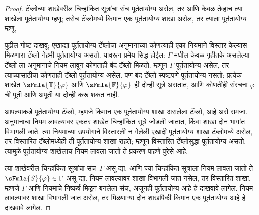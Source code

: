 \documentclass[11pt,a4paper,openany]{book}
\theoremstyle{definition}
\newcommand{\True}{\ensuremath{\mathbb{T}}}
\newcommand{\False}{\ensuremath{\mathbb{F}}}
\begin{document}
\begin{proof}
टॅब्लोच्या शाखेवरील चिन्हांकित सूत्रांचा संच पूर्ततायोग्य असेल, तर
आणि केवळ तेव्हाच त्या शाखेला पूर्ततायोग्य म्हणू; तसेच टॅब्लोमध्ये
किमान एक पूर्ततायोग्य शाखा असेल, तर त्याला पूर्ततायोग्य म्हणू.

पुढील गोष्ट दाखवू: एखाद्या पूर्ततायोग्य टॅब्लोचा अनुमानाच्या कोणत्याही
एका नियमाने विस्तार केल्यास मिळणारा टॅब्लो नेहमी पूर्ततायोग्य असतो.
यावरून प्रमेय सिद्ध होईल: $\Gamma$ मधील केवळ गृहीतके असलेल्या टॅब्लो ला
अनुमानाचे नियम लावून कोणताही बंद टॅब्लो मिळतो. म्हणून $\Gamma$
पूर्ततायोग्य असेल, तर त्याच्यासाठीचा कोणताही टॅब्लो पूर्ततायोग्य असेल.
पण बंद टॅब्लो स्पष्टपणे पूर्ततायोग्य नसतो: प्रत्येक शाखेत
$\sFmla{\True}{\varphi}$ आणि $\sFmla{\False}{\varphi}$ ही दोन्ही सूत्रे असतात, आणि
कोणतीही संरचना $\varphi$ ची पूर्ती आणि अपूर्ती या दोन्ही करू शकत नाही.

आपल्याकडे पूर्ततायोग्य टॅब्लो, म्हणजे किमान एक पूर्ततायोग्य शाखा असलेला
टॅब्लो, आहे असे समजा. अनुमानाचा नियम लावल्यावर एकतर शाखेत
चिन्हांकित सूत्रे जोडली जातात, किंवा शाखा दोन भागांत विभागली जाते. त्या
नियमाच्या उपयोगाने विस्तारली न गेलेली एखादी पूर्ततायोग्य शाखा टॅब्लोमध्ये
असेल, तर विस्तारित टॅब्लोमध्येही ती पूर्ततायोग्य शाखा राहते; म्हणून
विस्तारित टॅब्लोसुद्धा पूर्ततायोग्य असतो. त्यामुळे पूर्ततायोग्य शाखेलाच नियम
लावला जातो ते प्रकरण पाहणे पुरेसे आहे.

त्या शाखेवरील चिन्हांकित सूत्रांचा संच~$\Gamma$ असू द्या, आणि ज्या
चिन्हांकित सूत्राला नियम लावला जातो ते $\sFmla{S}{\varphi} \in \Gamma$ असू
द्या. नियम लावल्यावर शाखा विभागली जात नसेल, तर विस्तारित शाखा, म्हणजे
$\Gamma$ आणि नियमाचे निष्कर्ष मिळून बनलेला संच, अजूनही पूर्ततायोग्य आहे हे
दाखवावे लागेल. नियम लावल्यावर शाखा विभागली जात असेल, तर मिळणाऱ्या दोन
शाखांपैकी किमान एक पूर्ततायोग्य आहे हे दाखवावे लागेल.


\end{proof}
\end{document}
